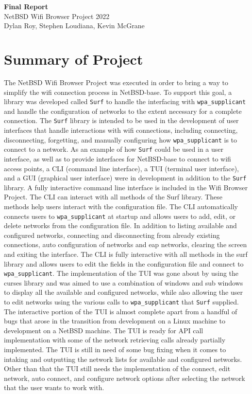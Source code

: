 \documentclass[11pt]{article}
\begin{document}
\begin{center}
  \textbf{\Large Final Report}\\\large NetBSD Wifi Browser Project 2022\\
  Dylan Roy, Stephen Loudiana, Kevin McGrane
\end{center}

\section*{Summary of Project}
The NetBSD Wifi Browser Project was executed in order to bring a way
to simplify the wifi connection process in NetBSD-base.
To support this goal, a library was developed called \texttt{Surf} to
handle the interfacing with \texttt{wpa\_supplicant} and handle the
configuration of networks to the extent necessary for a complete connection.
The \texttt{Surf} library is intended to be used in the development of
user interfaces that handle interactions with wifi connections, including
connecting, disconnecting, forgetting, and manually configuring how
\texttt{wpa\_supplicant} is to connect to a network.
As an example of how \texttt{Surf} could be used in a user interface, as
well as to provide interfaces for NetBSD-base to connect to wifi access points, 
a CLI (command line interface), a TUI (terminal user interface), and a GUI
(graphical user interface) were in development in addition to the \texttt{Surf} library. 
A fully interactive command line interface is included in the Wifi Browser Project. The 
CLI can interact with all methods of the Surf library. These methods help users interact 
with the configuration file. The CLI automatically connects users to \texttt{wpa\_supplicant} 
at startup and allows users to add, edit, or delete networks from the configuration file. 
In addition to listing available and configured networks, connecting and disconnecting from 
already existing connections, auto configuration of networks and eap networks, clearing 
the screen and exiting the interface. The CLI is fully interactive with all methods in the 
surf library and allows users to edit the fields in the configuration file and connect to 
\texttt{wpa\_supplicant}. The implementation of the TUI was gone about by using the
curses library and was aimed to use a combination of windows and sub windows to display all
the available and configured networks, while also allowing the user to edit networks
using the various calls to \texttt{wpa\_supplicant} that \texttt{Surf} supplied. 
The interactive portion of the TUI is almost complete apart from a handful of bugs that arose
in the transition from development on a Linux machine to development on a NetBSD machine.
The TUI is ready for API call implementation with some of the network retrieving calls already
partially implemented. The TUI is still in need of some bug fixing when it comes to intaking and
outputting the network lists for available and configured networks. Other than that the TUI
still needs the implementation of the connect, edit network, auto connect, and configure network
options after selecting the network that the user wants to work with.
\end{document}
